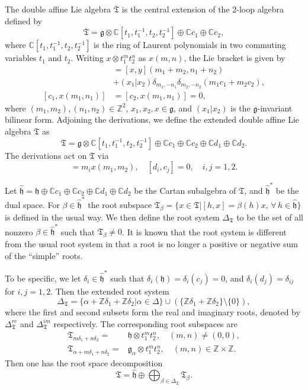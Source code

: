 \documentclass[11pt]{amsproc}
\theoremstyle{definition}
\theoremstyle{remark}
\numberwithin{equation}{section} \errorcontextlines=0
\begin{document}
The double affine Lie algebra $\overline{\mathfrak{T}}$ is the
central extension of the 2-loop algebra defined by
$$\overline{\mathfrak{T}}= \mathfrak{g}\otimes
\mathbb{C}[t_1,t_1^{-1},t_2,t_2^{-1}]\oplus \mathbb{C}c_1\oplus
\mathbb{C}c_2,$$
where $\mathbb{C}[t_1,t_1^{-1},t_2,t_2^{-1}]$ is
the ring of Laurent polynomials in two commuting variables $t_1$
and $t_2$. Writing $x\otimes t_1^m t_2^n$ as $x(m,n)$, the Lie
bracket is given by
\begin{align}
[x(m_1, n_1), y(m_2, n_2)]&=[x, y](m_1+m_2, n_1+n_2)\\
  \nonumber                            &+(x_1|x_2)\delta_{m_1,-n_1}\delta_{m_2,-n_2}(m_1c_1+m_2c_2),\\
[c_1, x(m_1, n_1)]&=[c_2, x(m_1, n_1)]=0,
\end{align}
where $(m_1,m_2), (n_1,n_2)\in\mathbb{Z}^2$, $x_1,x_2,x\in
\mathfrak{g}$, and $(x_1|x_2)$ is the $\mathfrak{g}$-invariant
bilinear form. Adjoining the derivations, we define
the extended double affine Lie algebra ${\mathfrak T}$ as
$$\mathfrak T= \mathfrak{g}\otimes
\mathbb{C}[t_1,t_1^{-1},t_2,t_2^{-1}]\oplus \mathbb{C}c_1\oplus
\mathbb{C}c_2\oplus \mathbb{C}d_1\oplus \mathbb{C}d_2.$$
The derivations act on $\mathfrak T$ via
\begin{equation}
[d_i,x(m_1,m_2)]= m_ix(m_1, m_2), \quad [d_i, c_j]=0, \quad
i,j=1,2.
\end{equation}

Let $\hat{\mathfrak h}=\mathfrak{h}\oplus\mathbb Cc_1\oplus\mathbb
Cc_2\oplus\mathbb Cd_1 \oplus\mathbb Cd_2$ be the Cartan subalgebra
of $\mathfrak T$, and $\hat{\mathfrak h}^{*}$ be the dual space.
For $\beta\in\hat{\mathfrak h}^{*}$ the root subspace $\mathfrak
T_{\beta}=\{x\in\mathfrak T|[h,x]=\beta(h)x, \, \forall \,
h\in\hat{\mathfrak h}\}$ is defined in the usual way. We then define
the root system $\Delta_{\mathfrak T}$ to be the set of all nonzero
$\beta\in\hat{\mathfrak h}^{*}$ such that $\mathfrak T_{\beta}\neq
0$. It is
known that \cite{MS} the root system is different from
the usual root system in that a root is no longer a positive or
negative sum of the ``simple'' roots.

To be specific, we let $\delta_i\in\hat{\mathfrak
h}^{\ast}$ such that $\delta_i(\mathfrak{h})=\delta_i(c_j)=0$, and
$\delta_i(d_j)=\delta_{ij}$ for $i,j=1,2$. Then the extended root
system
$$\Delta_{\mathfrak T}=\{\alpha+\mathbb{Z}\delta_1+\mathbb{Z}\delta_2|\alpha\in\Delta\}
\cup(\{\mathbb{Z}\delta_1+\mathbb{Z}\delta_2\}\setminus\{0\}),$$
where the first and second subsets form the real and imaginary roots, denoted
by $\Delta_{\mathfrak T}^{re}$ and $\Delta_{\mathfrak
T}^{im}$ respectively. The corresponding root subspaces are
\begin{align*}
\mathfrak T_{m\delta_1+n\delta_2}=&\mathfrak{h}\otimes
t_1^mt_2^n,\quad (m,n)\neq(0,0), \\
\mathfrak
T_{\alpha+m\delta_1+n\delta_2}=&\mathfrak{g}_{\alpha}\otimes
t_1^mt_2^n,\quad (m,n)\in \mathbb{Z}\times\mathbb{Z}.
\end{align*}
Then one has the root space decomposition
$$\mathfrak T=
\hat{\mathfrak h}\oplus\bigoplus_{\beta\in\Delta_{\mathfrak T}}\mathfrak T_{\beta}.$$
\end{document}
